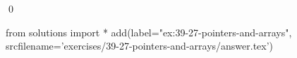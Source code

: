 
\begin{ex}
  \label{ex:39-27-pointers-and-arrays}
  
  \qed
\end{ex}
\begin{python0}
from solutions import *
add(label="ex:39-27-pointers-and-arrays",
    srcfilename='exercises/39-27-pointers-and-arrays/answer.tex')
\end{python0}

